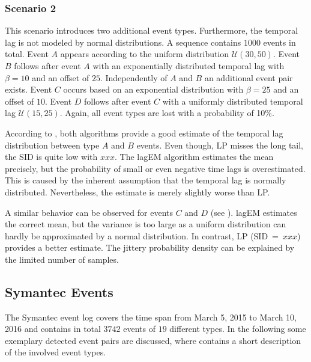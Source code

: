 \documentclass[journal, 10pt]{IEEEtran}
\begin{document}
\subsubsection{Scenario 2}
This scenario introduces two additional event types. Furthermore, the temporal lag is not modeled by normal distributions. A sequence contains $1000$ events in total. Event $A$ appears according to the uniform distribution $\mathcal{U}(30, 50)$. Event $B$ follows after event $A$ with an exponentially distributed temporal lag with $\beta = 10$ and an offset of $25$. Independently of $A$ and $B$ an additional event pair exists. Event $C$ occurs based on an exponential distribution with $\beta = 25$ and an offset of $10$. Event $D$ follows after event $C$ with a uniformly distributed temporal lag $\mathcal{U}(15, 25)$. Again, all event types are lost with a probability of 10\%.

According to \Fig{}, both algorithms provide a good estimate of the temporal lag distribution between type $A$ and $B$ events.
Even though, LP misses the long tail, the SID is quite low with $xxx$. The lagEM algorithm estimates the mean precisely, but the probability of small or even negative time lags is overestimated. This is caused by the inherent assumption that the temporal lag is normally distributed. Nevertheless, the estimate is merely slightly worse than LP.

A similar behavior can be observed for events $C$ and $D$ (see \Fig{}). lagEM estimates the correct mean, but the variance is too large as a uniform distribution can hardly be approximated by a normal distribution. %
In contrast, LP (SID~=~$xxx$) provides a better estimate. The jittery probability density can be explained by the limited number of samples.

\subsection{Symantec Events}
\label{sec:results_symantec}
%
The Symantec event log covers the time span from March 5, 2015 to March 10, 2016 and contains in total $3742$ events of $19$ different types. 
In the following some exemplary detected event pairs are discussed, where  contains a short description of the involved event types. 
\end{document}
